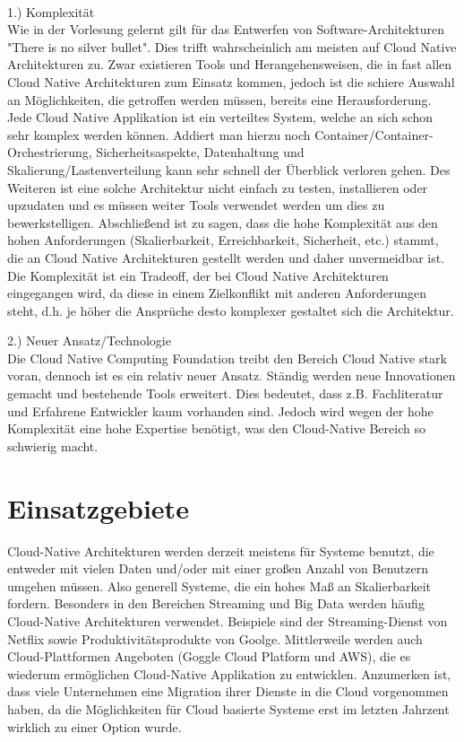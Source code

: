 \\
1.) Komplexität\\
Wie in der Vorlesung gelernt gilt für das Entwerfen von Software-Architekturen "There is no silver bullet". Dies trifft wahrscheinlich am meisten auf Cloud Native Architekturen zu. Zwar existieren Tools und Herangehensweisen, die in fast allen Cloud Native Architekturen zum Einsatz kommen, jedoch ist die schiere Auswahl an Möglichkeiten, die getroffen werden müssen, bereits eine Herausforderung. 
Jede Cloud Native Applikation ist ein verteiltes System, welche an sich schon sehr komplex werden können. Addiert man hierzu noch Container/Container-Orchestrierung, Sicherheitsaspekte, Datenhaltung und Skalierung/Lastenverteilung kann sehr schnell der Überblick verloren gehen. Des Weiteren ist eine solche Architektur nicht einfach zu testen, installieren oder upzudaten und es müssen weiter Tools verwendet werden um dies zu bewerkstelligen.
Abschließend ist zu sagen, dass die hohe Komplexität aus den hohen Anforderungen (Skalierbarkeit, Erreichbarkeit, Sicherheit, etc.) stammt, die an Cloud Native Architekturen gestellt werden und daher unvermeidbar ist. Die Komplexität ist ein Tradeoff, der bei Cloud Native Architekturen eingegangen wird, da diese in einem Zielkonflikt mit anderen Anforderungen steht, d.h. je höher die Ansprüche desto komplexer gestaltet sich die Architektur.


2.) Neuer Ansatz/Technologie\\
Die Cloud Native Computing Foundation treibt den Bereich Cloud Native stark voran, dennoch ist es ein relativ neuer Ansatz. Ständig werden neue Innovationen gemacht und bestehende Tools erweitert. Dies bedeutet, dass z.B. Fachliteratur und Erfahrene Entwickler kaum vorhanden sind. Jedoch wird wegen der hohe Komplexität eine hohe Expertise benötigt, was den Cloud-Native Bereich so schwierig macht.

\section{Einsatzgebiete}
Cloud-Native Architekturen werden derzeit meistens für Systeme benutzt, die entweder mit vielen Daten und/oder mit einer großen Anzahl von Benutzern umgehen müssen. Also generell Systeme, die ein hohes Maß an Skalierbarkeit fordern. Besonders in den Bereichen Streaming und Big Data werden häufig Cloud-Native Architekturen verwendet. 
Beispiele sind der Streaming-Dienst von Netflix sowie Produktivitätsprodukte von Goolge. Mittlerweile werden auch Cloud-Plattformen Angeboten (Goggle Cloud Platform und AWS), die es wiederum ermöglichen Cloud-Native Applikation zu entwicklen.
Anzumerken ist, dass viele Unternehmen eine Migration ihrer Dienste in die Cloud vorgenommen haben, da die Möglichkeiten für Cloud basierte Systeme erst im letzten Jahrzent wirklich zu einer Option wurde.